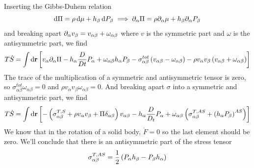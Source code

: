 Inserting the Gibbs-Duhem relation
\begin{equation}
    \mathop{}\!\mathrm{d} \Pi = \rho \mathop{}\!\mathrm{d} \mu + h_\beta \mathop{}\!\mathrm{d} P_\beta \implies \partial_\alpha \Pi = \rho \partial_\alpha \mu + h_\beta \partial_\alpha P_\beta
\end{equation}
and breaking apart \(\partial_\alpha v_\beta = v_{\alpha\beta} + \omega_{\alpha\beta}\) where \(v\) is the symmetric part and \(\omega\) is the antisymmetric part, we find
\begin{equation}
    T\dot{S} = \int \mathop{}\!\mathrm{d}\mathbf{r} \left[v_\alpha \partial_\alpha \Pi - h_\alpha \frac{D}{Dt} P_\alpha + \omega_{\alpha\beta} h_\alpha P_\beta - \sigma_{\alpha\beta}^{tot} \left(v_{\alpha\beta} - \omega_{\alpha\beta}\right) - \rho v_\alpha v_\beta \left(v_{\alpha\beta} + \omega_{\alpha\beta}\right)\right]
\end{equation}
The trace of the multiplication of a symmetric and antisymmetric tensor is zero, so \(\sigma_{\alpha\beta}^{tot}\omega_{\alpha\beta} = 0\) and \( \rho v_\alpha v_\beta \omega_{\alpha\beta} = 0\). And breaking apart \(\sigma \) into a symmetric and antisymmetric part, we find
\begin{equation}
    T\dot{S} = \int \mathop{}\!\mathrm{d}\mathbf{r} \left[-\left(\sigma_{\alpha\beta}^{T,S}+\rho v_\alpha v_\beta + \Pi\delta_{\alpha\beta}\right)v_{\alpha\beta}-h_\alpha\frac{D}{D_t}P_\alpha+\omega_{\alpha\beta}\left(\sigma_{\alpha\beta}^{T,AS}+\left(h_\alpha P_\beta\right)^{AS}\right)\right]
\end{equation}
We know that in the rotation of a solid body, \(\dot{F}=0\) so the last element should be zero. We'll conclude that there is an antisymmetric part of the stress tensor
\begin{equation}
    \sigma_{\alpha\beta}^{T,AS} = \frac{1}{2}\left(P_\alpha h_\beta - P_\beta h_\alpha\right)
\end{equation}
